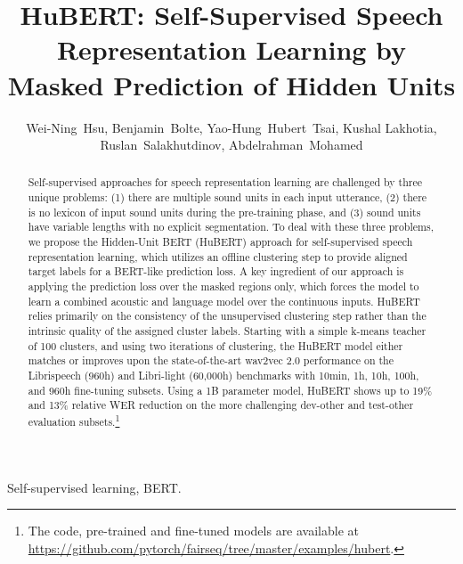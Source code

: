 \documentclass[journal]{IEEEtran}
\begin{document}
\title{HuBERT: Self-Supervised Speech Representation Learning by Masked Prediction of Hidden Units}
\author{Wei-Ning~Hsu,
        Benjamin~Bolte,
        Yao-Hung~Hubert~Tsai,
        Kushal Lakhotia,
        \\Ruslan~Salakhutdinov,
        Abdelrahman~Mohamed}

\maketitle

\begin{abstract}
Self-supervised approaches for speech representation learning are challenged by three unique problems: (1) there are multiple sound units in each input utterance, (2) there is no lexicon of input sound units during the pre-training phase, and (3) sound units have variable lengths with no explicit segmentation. To deal with these three problems, we propose the Hidden-Unit BERT (HuBERT) approach for self-supervised speech representation learning, which utilizes an offline clustering step to provide aligned target labels for a BERT-like prediction loss. A key ingredient of our approach is applying the prediction loss over the masked regions only, which forces the model to learn a combined acoustic and language model over the continuous inputs. HuBERT relies primarily on the consistency of the unsupervised clustering step rather than the intrinsic quality of the assigned cluster labels. Starting with a simple k-means teacher of 100 clusters, and using two iterations of clustering, the HuBERT model either matches or improves upon the state-of-the-art wav2vec 2.0 performance on the Librispeech (960h) and Libri-light (60,000h) benchmarks with 10min, 1h, 10h, 100h, and 960h fine-tuning subsets. Using a 1B parameter model, HuBERT shows up to 19\% and 13\% relative WER reduction on the more challenging dev-other and test-other evaluation subsets.\footnote{The code, pre-trained and fine-tuned models are available at \url{https://github.com/pytorch/fairseq/tree/master/examples/hubert}.}
\end{abstract}

\begin{IEEEkeywords}
Self-supervised learning, BERT.
\end{IEEEkeywords}

\IEEEpeerreviewmaketitle








\ifCLASSOPTIONcaptionsoff
  \newpage
\fi



\end{document}
